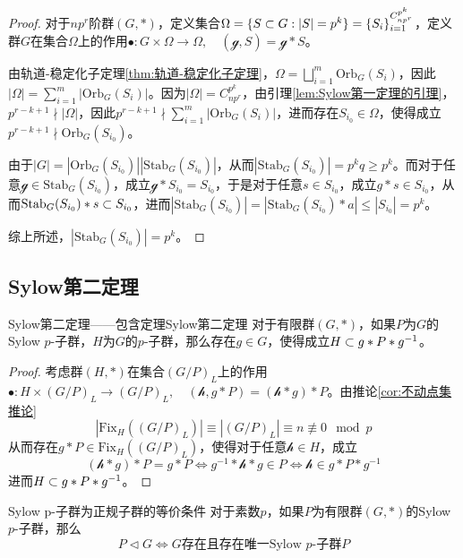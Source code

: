 \begin{proof}
	对于$np^r$阶群$(G,*)$，定义集合$\Omega=\{ S\subset G:|S|=p^k \}=\{S_i\}_{i=1}^{C_{np^r}^{p^k}}$，定义群$G$在集合$\Omega$上的作用$\bullet:G\times \Omega\to \Omega,\quad (\mathcal{g},S)=\mathcal{g}*S$。
	
	由轨道-稳定化子定理\ref{thm:轨道-稳定化子定理}，$\displaystyle \Omega=\bigsqcup_{i=1}^{m}\mathrm{Orb}_G(S_i)$，因此$\displaystyle |\Omega|=\sum_{i=1}^{m}|\mathrm{Orb}_G(S_i)|$。因为$|\Omega|=C_{np^r}^{p^k}$，由引理\ref{lem:Sylow第一定理的引理}，$p^{r-k+1}\nmid |\Omega|$，因此$\displaystyle p^{r-k+1}\nmid\sum_{i=1}^{m}|\mathrm{Orb}_G(S_i)|$，进而存在$S_{i_0}\in \Omega$，使得成立$p^{r-k+1}\nmid\mathrm{Orb}_G(S_{i_0})$。
	
	由于$|G|=|\mathrm{Orb}_G(S_{i_0})||\mathrm{Stab}_G(S_{i_0})|$，从而$|\mathrm{Stab}_G(S_{i_0})|=p^kq\ge p^k$。而对于任意$\mathcal{g}\in \mathrm{Stab}_G(S_{i_0})$，成立$\mathcal{g}*S_{i_0}=S_{i_0}$，于是对于任意$s\in S_{i_0}$，成立$g*s\in S_{i_0}$，从而$\mathrm{Stab}_G(S_{i_0})*s\subset S_{i_0}$，进而$|\mathrm{Stab}_G(S_{i_0})|=|\mathrm{Stab}_G(S_{i_0})*a|\le|S_{i_0}|=p^{k}$。
	
	综上所述，$|\mathrm{Stab}_G(S_{i_0})|=p^k$。
\end{proof}

\subsection{Sylow第二定理}

\begin{theorem}{Sylow第二定理——包含定理}{Sylow第二定理}
	对于有限群$(G,*)$，如果$P$为$G$的Sylow $p$-子群，$H$为$G$的$p$-子群，那么存在$g\in G$，使得成立$H\subset g*P*g^{-1}$。
\end{theorem}

\begin{proof}
	考虑群$(H,*)$在集合$(G/P)_L$上的作用$\bullet:H\times (G/P)_L\to (G/P)_L,\quad (\mathcal{h},g*P)=(\mathcal{h}*g)*P$。由推论\ref{cor:不动点集推论}
	$$
	|\mathrm{Fix}_H((G/P)_L)|\equiv |(G/P)_L|\equiv n\not\equiv 0\mod p
	$$
	从而存在$g*P\in \mathrm{Fix}_H((G/P)_L)$，使得对于任意$\mathcal{h}\in H$，成立
	$$
	(\mathcal{h}*g)*P=g*P\iff g^{-1}*\mathcal{h}*g\in P\iff \mathcal{h}\in g*P*g^{-1}
	$$
	进而$H\subset g*P*g^{-1}$。
\end{proof}

\begin{corollary}{}{Sylow p-子群为正规子群的等价条件}
	对于素数$p$，如果$P$为有限群$(G,*)$的Sylow $p$-子群，那么
	$$
	P\lhd G\iff G\text{存在且存在唯一Sylow }p\text{-子群}P
	$$
\end{corollary}

